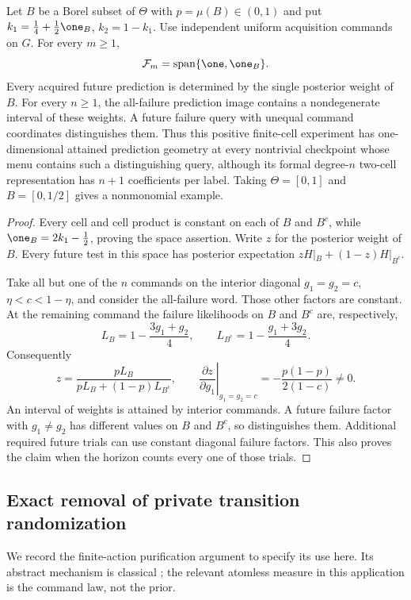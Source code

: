\begin{proposition}
\label{prop:v34-two-cell}
Let $B$ be a Borel subset of $\Theta$ with $p=\mu(B)\in(0,1)$ and
put $k_1=\tfrac14+\tfrac12\one_B$, $k_2=1-k_1$. Use independent
uniform acquisition commands on $G$. For every $m\ge1$,
\[
            \mathcal F_m=\operatorname{span}\{\one,\one_B\}.
\]
Every acquired future prediction is determined by the single posterior
weight of $B$. For every $n\ge1$, the all-failure prediction image
contains a nondegenerate interval of these weights. A future failure
query with unequal command coordinates distinguishes them. Thus this
positive finite-cell experiment has one-dimensional attained
prediction geometry at every nontrivial checkpoint whose menu contains
such a distinguishing query, although its
formal degree-$n$ two-cell representation has $n+1$ coefficients
per label. Taking $\Theta=[0,1]$ and $B=[0,1/2]$ gives a
nonmonomial example.
\end{proposition}
\begin{proof}
Every cell and cell product is constant on each of $B$ and $B^c$,
while $\one_B=2k_1-\tfrac12$, proving the space assertion. Write
$z$ for the posterior weight of $B$. Every future test in this space
has posterior expectation $zH|_B+(1-z)H|_{B^c}$.

Take all but one of the $n$ commands on the interior diagonal
$g_1=g_2=c$, $\eta<c<1-\eta$, and consider the all-failure word.
Those other factors are constant. At the remaining command the
failure likelihoods on $B$ and $B^c$ are, respectively,
\[
 L_B=1-\frac{3g_1+g_2}{4},\qquad
 L_{B^c}=1-\frac{g_1+3g_2}{4}.
\]
Consequently
\[
 z=\frac{pL_B}{pL_B+(1-p)L_{B^c}},\qquad
 \left.\frac{\partial z}{\partial g_1}\right|_{g_1=g_2=c}
       =-\frac{p(1-p)}{2(1-c)}\ne0.
\]
An interval of weights is attained by interior commands. A future
failure factor with $g_1\ne g_2$ has different values on $B$ and
$B^c$, so distinguishes them. Additional required future trials can
use constant diagonal failure factors. This also proves the claim
when the horizon counts every one of those trials.
\end{proof}

\subsection{Exact removal of private transition randomization}
We record the finite-action purification argument to specify its use
here. Its abstract mechanism is classical \cite{DWW1951}; the relevant
atomless measure in this application is the command law, not the prior.


